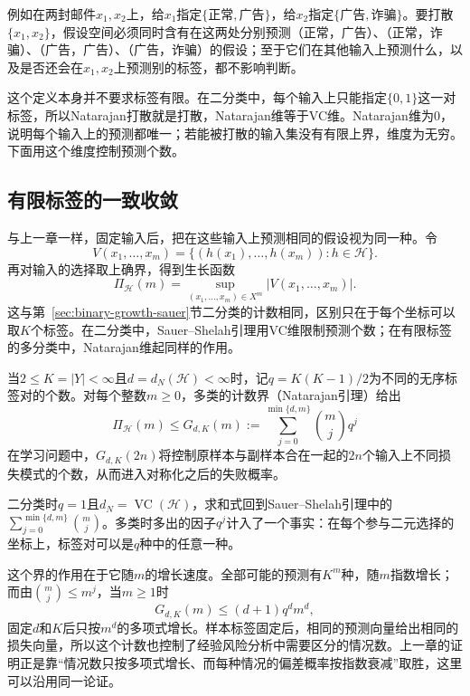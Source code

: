 例如在两封邮件$x_1,x_2$上，给$x_1$指定$\{\text{正常},\text{广告}\}$，给$x_2$指定$\{\text{广告},\text{诈骗}\}$。要打散$\{x_1,x_2\}$，假设空间必须同时含有在这两处分别预测（正常，广告）、（正常，诈骗）、（广告，广告）、（广告，诈骗）的假设；至于它们在其他输入上预测什么，以及是否还会在$x_1,x_2$上预测别的标签，都不影响判断。
\label{eq:learning-natarajan-shattering}

这个定义本身并不要求标签有限。在二分类中，每个输入上只能指定$\{0,1\}$这一对标签，所以Natarajan打散就是打散，Natarajan维等于VC维。Natarajan维为0，说明每个输入上的预测都唯一；若能被打散的输入集没有有限上界，维度为无穷。下面用这个维度控制预测个数。

\subsection{有限标签的一致收敛}

与上一章一样，固定输入后，把在这些输入上预测相同的假设视为同一种。令
\[
 V(x_1,\ldots,x_m)
 =\{(h(x_1),\ldots,h(x_m)):h\in\mathcal H\}.
\]
再对输入的选择取上确界，得到生长函数
\[
 \Pi_{\mathcal H}(m)=\sup_{(x_1,\ldots,x_m)\in X^m}|V(x_1,\ldots,x_m)|.
\]
这与第~\ref{sec:binary-growth-sauer}节二分类的计数相同，区别只在于每个坐标可以取$K$个标签。在二分类中，Sauer--Shelah引理用VC维限制预测个数；在有限标签的多分类中，Natarajan维起同样的作用。

\label{thm:learning-multiclass-growth-bound}
当$2\leq K=|Y|<\infty$且$d=d_N(\mathcal H)<\infty$时，记$q=K(K-1)/2$为不同的无序标签对的个数。对每个整数$m\geq0$，多类的计数界（Natarajan引理）给出
\[
 \Pi_{\mathcal H}(m)\leq G_{d,K}(m)
 :=\sum_{j=0}^{\min\{d,m\}}\binom mj q^j
\]
在学习问题中，$G_{d,K}(2n)$将控制原样本与副样本合在一起的$2n$个输入上不同损失模式的个数，从而进入对称化之后的失败概率。

二分类时$q=1$且$d_N=\operatorname{VC}(\mathcal H)$，求和式回到Sauer--Shelah引理中的$\sum_{j=0}^{\min\{d,m\}}\binom mj$。多类时多出的因子$q^j$计入了一个事实：在每个参与二元选择的坐标上，标签对可以是$q$种中的任意一种。

这个界的作用在于它随$m$的增长速度。全部可能的预测有$K^m$种，随$m$指数增长；而由$\binom mj\leq m^j$，当$m\geq1$时
\[
 G_{d,K}(m)\leq(d+1)q^dm^d,
\]
固定$d$和$K$后只按$m^d$的多项式增长。样本标签固定后，相同的预测向量给出相同的损失向量，所以这个计数也控制了经验风险分析中需要区分的情况数。上一章的证明正是靠“情况数只按多项式增长、而每种情况的偏差概率按指数衰减”取胜，这里可以沿用同一论证。

